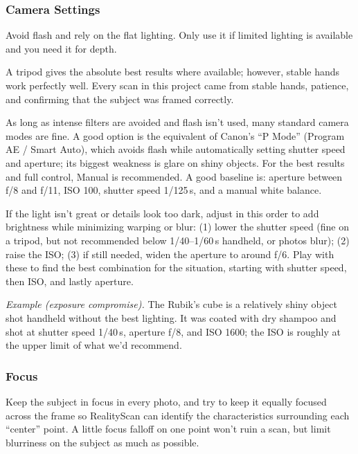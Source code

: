 \documentclass[11pt]{article}
\begin{document}
\subsubsection{Camera Settings}
\begin{description}[leftmargin=1.6em, style=nextline]
  \item[Flash] Avoid flash and rely on the flat lighting. Only use it if limited lighting is available and you need it for depth.
  \item[Stability] A tripod gives the absolute best results where available; however, stable hands work perfectly well. Every scan in this project came from stable hands, patience, and confirming that the subject was framed correctly.
  \item[Camera mode] As long as intense filters are avoided and flash isn't used, many standard camera modes are fine. A good option is the equivalent of Canon's ``P Mode'' (Program AE / Smart Auto), which avoids flash while automatically setting shutter speed and aperture; its biggest weakness is glare on shiny objects. For the best results and full control, Manual is recommended. A good baseline is: aperture between f/8 and f/11, ISO 100, shutter speed 1/125\,s, and a manual white balance.
  \item[Low-light compromises] If the light isn't great or details look too dark, adjust in this order to add brightness while minimizing warping or blur: (1) lower the shutter speed (fine on a tripod, but not recommended below 1/40--1/60\,s handheld, or photos blur); (2) raise the ISO; (3) if still needed, widen the aperture to around f/6. Play with these to find the best combination for the situation, starting with shutter speed, then ISO, and lastly aperture.
\end{description}

\noindent\textit{Example (exposure compromise).} The Rubik's cube is a relatively shiny object shot handheld without the best lighting. It was coated with dry shampoo and shot at shutter speed 1/40\,s, aperture f/8, and ISO 1600; the ISO is roughly at the upper limit of what we'd recommend.

\subsubsection{Focus}
Keep the subject in focus in every photo, and try to keep it equally focused across the frame so RealityScan can identify the characteristics surrounding each ``center'' point. A little focus falloff on one point won't ruin a scan, but limit blurriness on the subject as much as possible.
\end{document}
